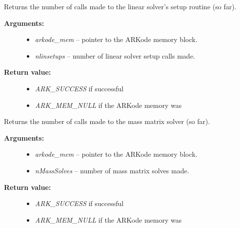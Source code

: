 \documentclass[letterpaper,10pt,english]{sphinxmanual}
\begin{document}
\begin{fulllineitems}
\label{c_interface/User_callable:ARKodeGetNumLinSolvSetups}
Returns the number of calls made to the linear solver's
setup routine (so far).
\begin{description}
\item[{\textbf{Arguments:}}] \leavevmode\begin{itemize}
\item {} 
\emph{arkode\_mem} -- pointer to the ARKode memory block.

\item {} 
\emph{nlinsetups} -- number of linear solver setup calls made.

\end{itemize}

\item[{\textbf{Return value:}}] \leavevmode\begin{itemize}
\item {} 
\emph{ARK\_SUCCESS} if successful

\item {} 
\emph{ARK\_MEM\_NULL} if the ARKode memory was 

\end{itemize}

\end{description}

\end{fulllineitems}


\begin{fulllineitems}
\label{c_interface/User_callable:ARKodeGetNumMassSolves}
Returns the number of calls made to the mass matrix solver (so far).
\begin{description}
\item[{\textbf{Arguments:}}] \leavevmode\begin{itemize}
\item {} 
\emph{arkode\_mem} -- pointer to the ARKode memory block.

\item {} 
\emph{nMassSolves} -- number of mass matrix solves made.

\end{itemize}

\item[{\textbf{Return value:}}] \leavevmode\begin{itemize}
\item {} 
\emph{ARK\_SUCCESS} if successful

\item {} 
\emph{ARK\_MEM\_NULL} if the ARKode memory was 

\end{itemize}

\end{description}

\end{fulllineitems}
\end{document}
